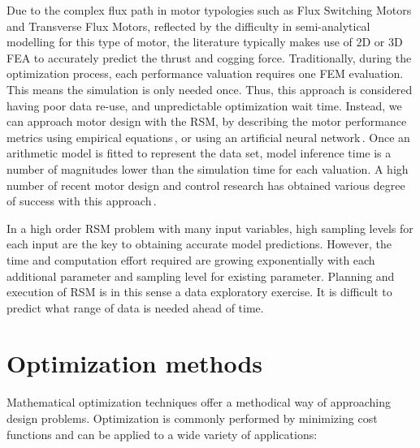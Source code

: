         Due to the complex flux path in motor typologies such as Flux Switching Motors and Transverse Flux Motors, reflected by the difficulty in semi-analytical modelling for this type of motor, the literature typically makes use of $\mathrm{2D}$ or $\mathrm{3D}$ \acs{FEA} to accurately predict the thrust and cogging force. Traditionally, during the optimization process, each performance valuation requires one FEM evaluation. This means the simulation is only needed once. Thus, this approach is considered having poor data re-use, and unpredictable optimization wait time. Instead, we can approach motor design with the \acf{RSM}, by describing the motor performance metrics using empirical equations\,\cite{Hong2008,Lei2013}, or using an artificial neural network\,\cite{Hadjout2006,Ashabani2010OptimumApproach}. Once an arithmetic model is fitted to represent the data set, model inference time is a number of magnitudes lower than the simulation time for each valuation. A high number of recent motor design and control research has obtained various degree of success with this approach\,\cite{Hwang2007RotorMethod,Lee2012OptimumMethod,Kim2006OptimalMethodology,Jung2015AdaptiveDrives,Hong2018DesignApplications}. 
        
        
        In a high order \acs{RSM} problem with many input variables, high sampling levels for each input are the key to obtaining accurate model predictions. However, the time and computation effort required are growing exponentially with each additional parameter and sampling level for existing parameter. Planning and execution of \acs{RSM} is in this sense a data exploratory exercise. It is difficult to predict what range of data is needed ahead of time.


\section{Optimization methods}                      \label{Chapter:background/optimization methods}
    
    
    Mathematical optimization techniques offer a methodical way of approaching design problems. Optimization is commonly performed by minimizing cost functions and can be applied to a wide variety of applications:
    

